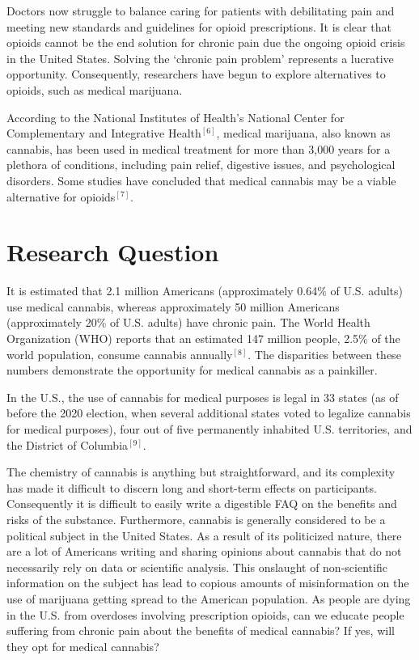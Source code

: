 \documentclass[
]{article}
\begin{document}
Doctors now struggle to balance caring for patients with debilitating
pain and meeting new standards and guidelines for opioid prescriptions.
It is clear that opioids cannot be the end solution for chronic pain due
the ongoing opioid crisis in the United States. Solving the `chronic
pain problem' represents a lucrative opportunity. Consequently,
researchers have begun to explore alternatives to opioids, such as
medical marijuana.

According to the National Institutes of Health's National Center for
Complementary and Integrative Health\(^{[6]}\), medical marijuana, also
known as cannabis, has been used in medical treatment for more than
3,000 years for a plethora of conditions, including pain relief,
digestive issues, and psychological disorders. Some studies have
concluded that medical cannabis may be a viable alternative for
opioids\(^{[7]}\).

\hypertarget{research-question}{%
\section{Research Question}\label{research-question}}

It is estimated that 2.1 million Americans (approximately 0.64\% of U.S.
adults) use medical cannabis, whereas approximately 50 million Americans
(approximately 20\% of U.S. adults) have chronic pain. The World Health
Organization (WHO) reports that an estimated 147 million people, 2.5\%
of the world population, consume cannabis annually\(^{[8]}\). The
disparities between these numbers demonstrate the opportunity for
medical cannabis as a painkiller.

In the U.S., the use of cannabis for medical purposes is legal in 33
states (as of before the 2020 election, when several additional states
voted to legalize cannabis for medical purposes), four out of five
permanently inhabited U.S. territories, and the District of
Columbia\(^{[9]}\).

The chemistry of cannabis is anything but straightforward, and its
complexity has made it difficult to discern long and short-term effects
on participants. Consequently it is difficult to easily write a
digestible FAQ on the benefits and risks of the substance. Furthermore,
cannabis is generally considered to be a political subject in the United
States. As a result of its politicized nature, there are a lot of
Americans writing and sharing opinions about cannabis that do not
necessarily rely on data or scientific analysis. This onslaught of
non-scientific information on the subject has lead to copious amounts of
misinformation on the use of marijuana getting spread to the American
population. As people are dying in the U.S. from overdoses involving
prescription opioids, can we educate people suffering from chronic pain
about the benefits of medical cannabis? If yes, will they opt for
medical cannabis?
\end{document}
